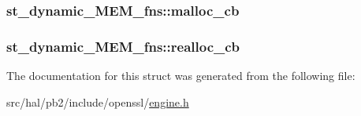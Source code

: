 \subsubsection[{\texorpdfstring{malloc\+\_\+cb}{malloc_cb}}]{ st\+\_\+dynamic\+\_\+\+M\+E\+M\+\_\+fns\+::malloc\+\_\+cb}\hypertarget{structst__dynamic___m_e_m__fns_af75222a0702aedaf6a9d1156ef9784ed}{}\label{structst__dynamic___m_e_m__fns_af75222a0702aedaf6a9d1156ef9784ed}
\subsubsection[{\texorpdfstring{realloc\+\_\+cb}{realloc_cb}}]{ st\+\_\+dynamic\+\_\+\+M\+E\+M\+\_\+fns\+::realloc\+\_\+cb}\hypertarget{structst__dynamic___m_e_m__fns_a40fb5719d28a6c452821f0cb0eca231a}{}\label{structst__dynamic___m_e_m__fns_a40fb5719d28a6c452821f0cb0eca231a}


The documentation for this struct was generated from the following file\+:\begin{DoxyCompactItemize}
\item 
src/hal/pb2/include/openssl/\hyperlink{engine_8h}{engine.\+h}\end{DoxyCompactItemize}
